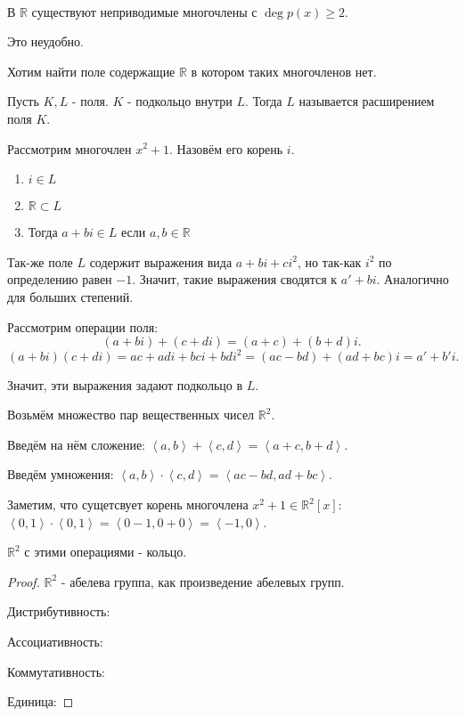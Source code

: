 \begin{remark} ~\\[-12pt]

    В $\mathbb{R}$ существуют неприводимые многочлены с $\deg p(x) \ge 2$.

    Это неудобно.

    Хотим найти поле содержащие $\mathbb{R}$ в котором таких многочленов нет.
\end{remark}
\begin{definition} 
    Пусть $K, L$ - поля. $K$ - подкольцо внутри $L$. Тогда $L$ называется расширением поля $K$.
\end{definition}

Рассмотрим многочлен $x^2+1$. Назовём его корень $i$.

\begin{enumerate}
    \item $i\in L$
    \item $\mathbb{R} \subset L$
    \item Тогда $a+bi\in L$ если $a, b\in \mathbb{R}$
\end{enumerate}

Так-же поле $L$ содержит выражения вида $a+bi+ci^2$, но так-как $i^2$ по определению равен $-1$. Значит, такие выражения сводятся к $a'+bi$. Аналогично для больших степений.

Рассмотрим операции поля:
\[ (a+bi)+(c+di) = (a+c)+(b+d)i .\] 
\[ (a+bi)(c+di) = ac+adi+bci+bdi^2 = (ac-bd)+(ad+bc)i = a'+b'i .\]

Значит, эти выражения задают подкольцо в $L$.

Возьмём множество пар вещественных чисел $\mathbb{R}^2$.

Введём на нём сложение: $\left<a, b\right> + \left<c, d\right> = \left<a+c, b+d\right>$.

Введём умножения: $\left<a, b\right> \cdot \left<c, d\right> = \left<ac-bd, ad+bc\right>$.

Заметим, что сущетсвует корень многочлена $x^2+1\in \mathbb{R}^2[x]$: $\left<0, 1\right>\cdot \left<0, 1\right> = \left<0 - 1, 0 + 0\right> = \left<-1, 0\right>$.

\begin{theorem} 
    $\mathbb{R}^2$ с этими операциями - кольцо.
    \begin{proof}
        $\mathbb{R}^2$ - абелева группа, как произведение абелевых групп.
        
        \TODO
        
        Дистрибутивность:

        Ассоциативность:

        Коммутативность:

        Единица:
    \end{proof}
\end{theorem}

